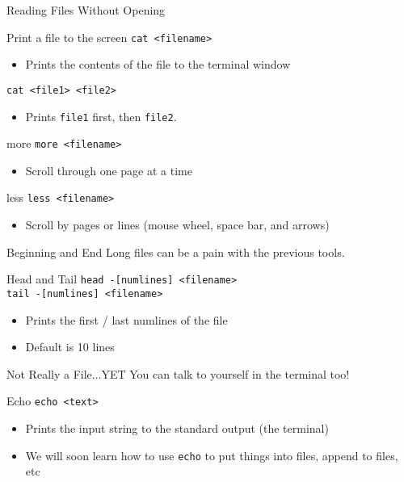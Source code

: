 \documentclass[11pt]{beamer}
\newcommand{\colbf}[1]{\textcolor{mLightBrown!77!black}{#1}}%
\begin{document}
\begin{frame}[fragile]{Reading Files Without Opening}
  \begin{block}{Print a file to the screen}
    \texttt{cat <filename>}
    \begin{itemize}
      \item Prints the contents of the file to the terminal window
    \end{itemize}
    \texttt{cat <file1> <file2>}
    \begin{itemize}
      \item Prints \texttt{file1} first, then \texttt{file2}.
    \end{itemize}
  \end{block}
  \begin{block}{\colbf{more}}
    \texttt{more <filename>}
    \begin{itemize}
      \item Scroll through one page at a time
    \end{itemize}
  \end{block}
  \begin{block}{\colbf{less}}
    \texttt{less <filename>}
    \begin{itemize}
      \item Scroll by pages or lines (mouse wheel, space bar, and arrows)
    \end{itemize}
  \end{block}
\end{frame}

\begin{frame}[fragile]{Beginning and End}
  Long files can be a pain with the previous tools.

  \begin{block}{\colbf{Head} and \colbf{Tail}}
    \texttt{head -[numlines] <filename>}\\
    \texttt{tail -[numlines] <filename>}
    \begin{itemize}
      \item Prints the first / last numlines of the file
      \item Default is 10 lines
    \end{itemize}
  \end{block}
\end{frame}

\begin{frame}[fragile]{Not Really a File...YET}
  You can talk to yourself in the terminal too!

  \begin{block}{\colbf{Echo}}
    \texttt{echo <text>}
    \begin{itemize}
      \item Prints the input string to the standard output (the terminal)
      \item We will soon learn how to use \texttt{echo} to put things into files, append to files, etc
    \end{itemize}
  \end{block}
\end{frame}
%
\end{document}

